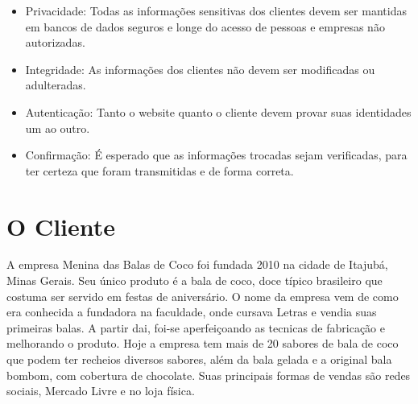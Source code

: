\begin{itemize}
  \item Privacidade: Todas as informações sensitivas dos clientes devem ser mantidas em bancos de dados seguros e longe do acesso de pessoas e empresas não autorizadas.
  \item Integridade: As informações dos clientes não devem ser modificadas ou adulteradas.
  \item Autenticação: Tanto o website quanto o cliente devem provar suas identidades um ao outro.
  \item Confirmação: É esperado que as informações trocadas sejam verificadas, para ter certeza que foram transmitidas e de forma correta.
\end{itemize}

\section{O Cliente}

A empresa Menina das Balas de Coco foi fundada 2010 na cidade de Itajubá, Minas Gerais. Seu único produto é a bala de coco, doce típico brasileiro que costuma ser servido em festas de aniversário. O nome da empresa vem de como era conhecida a fundadora na faculdade, onde cursava Letras e vendia suas primeiras balas. A partir dai, foi-se aperfeiçoando as tecnicas de fabricação e melhorando o produto. Hoje a empresa tem mais de 20 sabores de bala de coco que podem ter recheios diversos sabores, além da bala gelada e a original bala bombom, com cobertura de chocolate. Suas principais formas de vendas são redes sociais, Mercado Livre e no loja física.

